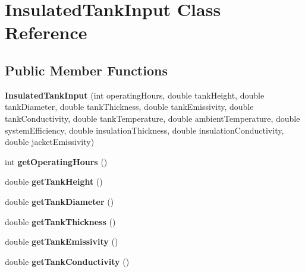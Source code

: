\hypertarget{class_insulated_tank_input}{}\section{Insulated\+Tank\+Input Class Reference}
\label{class_insulated_tank_input}
\subsection*{Public Member Functions}
\begin{DoxyCompactItemize}
\item 
\mbox{\label{class_insulated_tank_input_a0c907f9c88a2cc9151857fb42405df14}} 
{\bfseries Insulated\+Tank\+Input} (int operating\+Hours, double tank\+Height, double tank\+Diameter, double tank\+Thickness, double tank\+Emissivity, double tank\+Conductivity, double tank\+Temperature, double ambient\+Temperature, double system\+Efficiency, double insulation\+Thickness, double insulation\+Conductivity, double jacket\+Emissivity)
\item 
\mbox{\label{class_insulated_tank_input_acfba48cfbe1cb351746f37f143a8365b}} 
int {\bfseries get\+Operating\+Hours} ()
\item 
\mbox{\label{class_insulated_tank_input_a9a64c3eeae6f4b4c4c992dc11aaa28c6}} 
double {\bfseries get\+Tank\+Height} ()
\item 
\mbox{\label{class_insulated_tank_input_ad3b150db027aae91d37aff5450ff982a}} 
double {\bfseries get\+Tank\+Diameter} ()
\item 
\mbox{\label{class_insulated_tank_input_a90736683268c81eca197e40f5aa06546}} 
double {\bfseries get\+Tank\+Thickness} ()
\item 
\mbox{\label{class_insulated_tank_input_abb25db5115d46d28272482695630adf2}} 
double {\bfseries get\+Tank\+Emissivity} ()
\item 
\mbox{\label{class_insulated_tank_input_a6cc01289839f3aecf9887417bf9bf263}} 
double {\bfseries get\+Tank\+Conductivity} ()
\item 

\end{DoxyCompactItemize}
